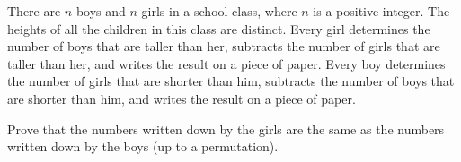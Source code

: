 There are $n$ boys and $n$ girls in a school class, where $n$ is a positive integer. The heights of all the children in this class are distinct. Every girl determines the number of boys that are taller than her, subtracts the number of girls that are taller than her, and writes the result on a piece of paper. Every boy determines the number of girls that are shorter than him, subtracts the number of boys that are shorter than him, and writes the result on a piece of paper.

Prove that the numbers written down by the girls are the same as the numbers written down by the boys (up to a permutation).